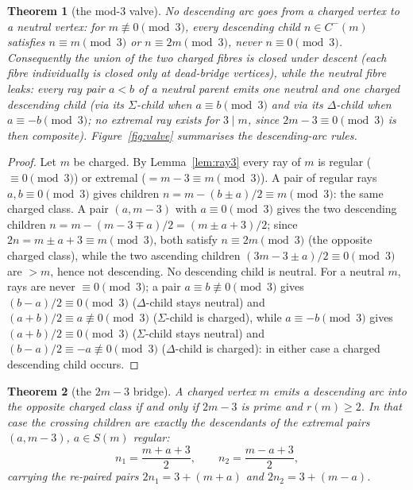 \documentclass[11pt]{article}
\theoremstyle{plain}
\newtheorem{theorem}{Theorem}[section]
\theoremstyle{definition}
\newcommand{\rays}{S}
\newcommand{\rch}{r}
\begin{document}
\begin{theorem}[the mod-3 valve]\label{thm:valve}
No descending arc goes from a charged vertex to a neutral vertex:
for $m \not\equiv 0 \pmod 3$, every descending child $n \in C^{-}(m)$
satisfies $n \equiv m \pmod 3$ or $n \equiv 2m \pmod 3$, never
$n \equiv 0 \pmod 3$. Consequently the union of the two charged
fibres is closed under descent (each fibre individually is closed
only at dead-bridge vertices), while the neutral fibre
\emph{leaks}: every ray pair
$a < b$ of a neutral parent emits one neutral and one charged
descending child (via its $\Sigma$-child when $a \equiv b \pmod 3$
and via its $\Delta$-child when $a \equiv -b \pmod 3$; no extremal
ray exists for $3 \mid m$, since $2m - 3 \equiv 0 \pmod 3$ is then
composite). Figure~\ref{fig:valve} summarises the descending-arc
rules.
\end{theorem}

\begin{proof}
Let $m$ be charged. By Lemma~\ref{lem:ray3} every ray of $m$ is
regular ($\equiv 0 \pmod 3$) or extremal ($= m-3 \equiv m \pmod 3$).
A pair of regular rays $a,b \equiv 0 \pmod 3$ gives children
$n = m - (b \pm a)/2 \equiv m \pmod 3$: the same charged class. A
pair $(a, m-3)$ with $a \equiv 0 \pmod 3$ gives the two descending
children $n = m - (m - 3 \mp a)/2 = (m \pm a + 3)/2$; since
$2n = m \pm a + 3 \equiv m \pmod 3$, both satisfy
$n \equiv 2m \pmod 3$ (the opposite charged class), while the two
ascending children $(3m - 3 \pm a)/2 \equiv 0 \pmod 3$ are $> m$,
hence not descending. No descending child is neutral. For a neutral
$m$, rays are never $\equiv 0 \pmod 3$; a pair
$a \equiv b \not\equiv 0 \pmod 3$ gives $(b-a)/2 \equiv 0 \pmod 3$
($\Delta$-child stays neutral) and
$(a+b)/2 \equiv a \not\equiv 0 \pmod 3$ ($\Sigma$-child is charged),
while $a \equiv -b \pmod 3$ gives $(a+b)/2 \equiv 0 \pmod 3$
($\Sigma$-child stays neutral) and
$(b-a)/2 \equiv -a \not\equiv 0 \pmod 3$ ($\Delta$-child is
charged): in either case a charged descending child occurs.
\end{proof}

\begin{theorem}[the $2m-3$ bridge]\label{thm:bridge}
A charged vertex $m$ emits a descending arc into the \emph{opposite}
charged class if and only if $2m-3$ is prime and $\rch(m) \ge 2$. In
that case the crossing children are exactly the descendants of the
extremal pairs $(a, m-3)$, $a \in \rays(m)$ regular:
\[
n_1 = \frac{m + a + 3}{2}, \qquad n_2 = \frac{m - a + 3}{2},
\]
carrying the re-paired pairs $2n_1 = 3 + (m + a)$ and
$2n_2 = 3 + (m - a)$.
\end{theorem}
\end{document}

